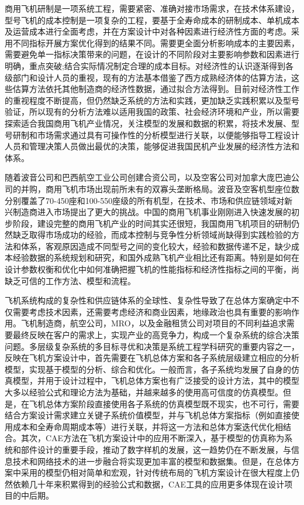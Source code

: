 \documentclass[12pt,a4paper]{report}
\begin{document}
商用飞机研制是一项系统工程，需要紧密、准确对接市场需求，在技术体系建设，型号飞机的成本控制是一项复杂的工程，要基于全寿命成本的研制成本、单机成本及运营成本进行全面考虑，并在方案设计中对各种因素进行经济性方面的考虑。采用不同指标开展方案优化得到的结果不同。需要更全面分析影响成本的主要因素，需要避免单一指标决策带来的问题，在设计的不同阶段对主要影响参数和因素进行明确，重点突破;结合实际情况制定合理的成本目标。对经济性的认识逐渐得到各级部门和设计人员的重视，现有的方法基本借鉴了西方成熟经济体的估算方法，这些估算方法依托其他制造商的经济性数据，通过拟合方法得到。目前对经济性工作的重视程度不断提高，但仍然缺乏系统的方法和实践，更加缺乏实践积累以及型号验证，所以现有的分析方法难以适用我国的政策、社会经济环境和产业，所以需要探索适合我国商用飞机产业情况，关注模型的发展和数据的积累，将技术发展、型号研制和市场需求通过具有可操作性的分析模型进行关联，以便能够指导工程设计人员和管理决策人员做出最优的决策，能够促进我国民机产业发展的经济性方法和体系。

随着波音公司和巴西航空工业公司创建合资公司，以及空客公司对加拿大庞巴迪公司的并购，商用飞机市场出现前所未有的双寡头垄断格局。波音及空客机型座位数分别覆盖了70-450座和100-550座级的所有机型，在技术、市场和供应链领域对新兴制造商进入市场提出了更大的挑战。中国的商用飞机事业刚刚进入快速发展的初步阶段，建设完整的商用飞机产业的时间其实还很短，我国商用飞机项目的研制仍然缺乏取得市场成功的经验，而成本控制与竞争性分析领域尚缺得到实践检验的方法和体系，客观原因造成不同型号之间的变化较大，经验和数据传递不足，缺少成本经验数据的系统规划和研究，和国外成熟飞机产业相比还有距离。特别是如何在设计参数权衡和优化中如何准确把握飞机的性能指标和经济性指标之间的平衡，尚缺乏可信的工作方法、模型和流程。

飞机系统构成的复杂性和供应链体系的全球性、复杂性导致了在总体方案确定中不仅需要考虑技术因素，还需要考虑经济和商业因素，地缘政治也具有重要的影响作用。飞机制造商，航空公司，MRO，以及金融租赁公司对项目的不同利益追求需要最终反映在客户的需求上，实现产业的高竞争力，构成一个复杂系统的综合决策问题。多层级复杂系统的多目标寻优和决策是系统工程学科研究的重要内容之一，反映在飞机方案设计中，首先需要在飞机总体方案和各子系统层级建立相应的分析模型，实现基于模型的分析、综合和优化。一般而言，各子系统均发展了自身的仿真模型，并用于设计过程中，飞机总体方案也有广泛接受的设计方法，其中的模型大多以经验公式和理论方法为基础，并越来越多的使用高可信度的仿真模型。但是，在飞机总体方案阶段直接使用各子系统的仿真模型既不现实，也不可行，需要结合方案设计需求建立关键子系统价值模型，并与飞机总体方案指标（例如直接使用成本和全寿命周期成本等）进行关联，并将这一方法和总体方案迭代优化相结合。其次，CAE方法在飞机方案设计中的应用不断深入，基于模型的仿真称为系统和部件设计的重要手段，推动了数字样机的发展，这一趋势仍在不断发展，与信息技术和网络技术的进一步融合将实现更加丰富的模型和数据集。但是，在总体方案中采用的模型仍相对简单和宏观，针对传统布局的飞机方案设计在很大程度上仍然依赖几十年来积累得到的经验公式和数据，CAE工具的应用更多体现在设计项目的中后期。
\end{document}

